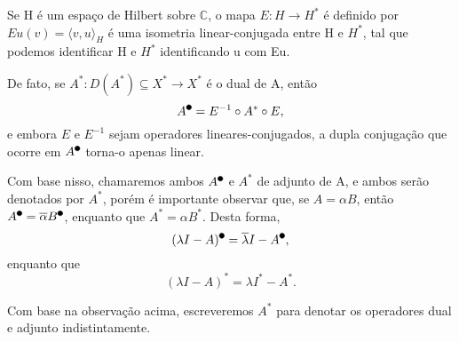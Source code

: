 \documentclass[../functional_analysis.tex]{subfiles}
\begin{document}
\begin{tcolorbox}[
		skin=enhanced,
		title=Observação,
		fonttitle=\bfseries,
		colframe=black,
		colbacktitle=cyan!75!white,
		colback=cyan!15,
		colbacklower=black,
		coltitle=black,
		drop fuzzy shadow,
	]
	Se H é um espaço de Hilbert sobre \(\mathbb{C}\), o mapa \(E:H\rightarrow H^{*}\) é definido por \(Eu(v) = \langle v, u \rangle_{H}\) é uma isometria
	linear-conjugada entre H e \(H^{*}\), tal que podemos identificar H e \(H^{*}\) identificando u com Eu.

	De fato, se \(A^{*}:D(A^{*})\subseteq X^{*}\rightarrow X^{*}\) é o dual de A, então
	\[
		A^{\tikz[baseline=-0.5ex]\draw[black, fill=black, radius=2pt](0, 0)circle;} = E^{-1}\circ A^{*}\circ E,
	\]
	e embora \(E\) e \(E^{-1}\) sejam operadores lineares-conjugados, a dupla conjugação que ocorre em \(A^{\tikz[baseline=-0.5ex]\draw[black, fill=black, radius=2pt](0, 0)circle;}\) torna-o
	apenas linear.

	Com base nisso, chamaremos ambos \(A^{\tikz[baseline=-0.5ex]\draw[black, fill=black, radius=2pt](0, 0)circle;}\) e \(A^{*}\) de adjunto de A, e ambos serão denotados por \(A^{*}\), porém é importante
	observar que, se \(A = \alpha B\), então \(A^{\tikz[baseline=-0.5ex]\draw[black, fill=black, radius=2pt](0, 0)circle;} = \overline{\alpha }B^{\tikz[baseline=-0.5ex]\draw[black, fill=black, radius=2pt](0, 0)circle;}\),
	enquanto que \(A^{*} = \alpha B^{*}\). Desta forma,
	\[
		(\lambda I - A)^{\tikz[baseline=-0.5ex]\draw[black, fill=black, radius=2pt](0, 0)circle;} = \overline{\lambda }I - A^{\tikz[baseline=-0.5ex]\draw[black, fill=black, radius=2pt](0, 0)circle;},
	\]
	enquanto que
	\[
		(\lambda I - A)^{*} = \lambda I^{*} - A^{*}.
	\]
\end{tcolorbox}

Com base na observação acima, escreveremos \(A^{*}\) para denotar os operadores dual e adjunto indistintamente.
\end{document}
